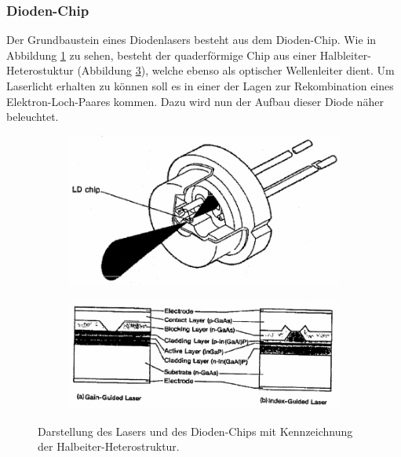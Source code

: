 \subsubsection{Dioden-Chip}
Der Grundbaustein eines Diodenlasers besteht aus dem Dioden-Chip. Wie in
Abbildung \ref{fig:chip} zu sehen, besteht der quaderförmige Chip aus einer
Halbleiter-Heterostuktur (Abbildung \ref{fig:struktur}), welche ebenso als
optischer Wellenleiter dient. Um
Laserlicht erhalten zu können soll es in einer der Lagen zur Rekombination
eines Elektron-Loch-Paares kommen. Dazu wird nun der Aufbau dieser Diode näher
beleuchtet.
\begin{figure}
  \begin{subfigure}[c]{0.5\textwidth}
    \centering
    \includegraphics[width=\textwidth]{images/Diodenl.pdf}
    \label{fig:chip}
  \end{subfigure}
  \begin{subfigure}[c]{0.5\textwidth}
    \includegraphics[width=\textwidth, angle=1, origin=c]{images/schema.pdf}
    \label{fig:struktur}
  \end{subfigure}
  \caption{Darstellung des Lasers und des Dioden-Chips mit Kennzeichnung der
  Halbeiter-Heterostruktur\cite{anleitung}.}
\end{figure}
